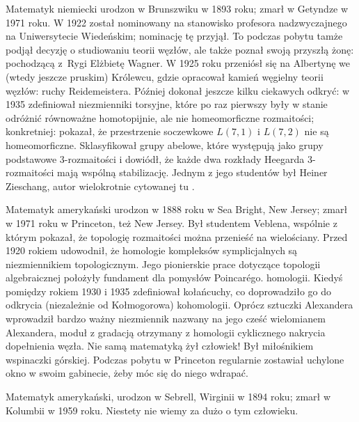 \begin{remark}
    Matematyk niemiecki urodzon w Brunszwiku w 1893 roku; zmarł w Getyndze w 1971 roku.
    W 1922 został nominowany na stanowisko profesora nadzwyczajnego na Uniwersytecie Wiedeńskim; nominację tę przyjął.
    To podczas pobytu tamże podjął decyzję o studiowaniu teorii węzłów, ale także poznał swoją przyszłą żonę: pochodzącą z~Rygi Elżbietę Wagner.
    W 1925 roku przeniósł się na Albertynę we (wtedy jeszcze pruskim) Królewcu, gdzie opracował kamień węgielny teorii węzłów: ruchy Reidemeistera.
    Później dokonał jeszcze kilku ciekawych odkryć: w 1935 zdefiniował niezmienniki torsyjne, które po raz pierwszy były w stanie odróżnić równoważne homotopijnie, ale nie homeomorficzne rozmaitości; konkretniej: pokazał, że przestrzenie soczewkowe $L(7, 1)$ i $L(7, 2)$ nie są homeomorficzne.
    Sklasyfikował grupy abelowe, które występują jako grupy podstawowe 3-rozmaitości i dowiódł, że każde dwa rozkłady Heegarda 3-rozmaitości mają wspólną stabilizację.
    Jednym z jego studentów był Heiner Zieschang, autor wielokrotnie cytowanej tu \cite{burde2014}.
\end{remark}

\begin{remark}
    Matematyk amerykański urodzon w 1888 roku w Sea Bright, New Jersey; zmarł w 1971 roku w Princeton, też New Jersey.
    Był studentem Veblena, wspólnie z którym pokazał, że topologię rozmaitości można przenieść na wielościany.
    Przed 1920 rokiem udowodnił, że homologie kompleksów symplicjalnych są niezmiennikiem topologicznym.
    Jego pionierskie prace dotyczące topologii algebraicznej położyły fundament dla pomysłów Poincarégo.
    homologii.
    Kiedyś pomiędzy rokiem 1930 i 1935 zdefiniował kołańcuchy, co doprowadziło go do odkrycia (niezależnie od Kołmogorowa) kohomologii.
    Oprócz sztuczki Alexandera wprowadził bardzo ważny niezmiennik nazwany na jego cześć wielomianem Alexandera, moduł z gradacją otrzymany z homologii cyklicznego nakrycia dopełnienia węzła.
    Nie samą matematyką żył człowiek!
    Był miłośnikiem wspinaczki górskiej.
    Podczas pobytu w Princeton regularnie zostawiał uchylone okno w swoim gabinecie, żeby móc się do niego wdrapać.
\end{remark}

\begin{remark}
    Matematyk amerykański, urodzon w Sebrell, Wirginii w 1894 roku; zmarł w Kolumbii w 1959 roku.
    Niestety nie wiemy za dużo o tym człowieku.
\end{remark}


